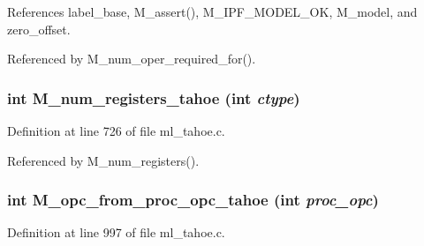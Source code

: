References label\_\-base, M\_\-assert(), M\_\-IPF\_\-MODEL\_\-OK, M\_\-model, and zero\_\-offset.

Referenced by M\_\-num\_\-oper\_\-required\_\-for().
\subsubsection{\setlength{\rightskip}{0pt plus 5cm}int M\_\-num\_\-registers\_\-tahoe (int {\em ctype})}\label{ml__tahoe_8c_4992cb0d712ac7229fddeb7990d4b6b7}




Definition at line 726 of file ml\_\-tahoe.c.

Referenced by M\_\-num\_\-registers().
\subsubsection{\setlength{\rightskip}{0pt plus 5cm}int M\_\-opc\_\-from\_\-proc\_\-opc\_\-tahoe (int {\em proc\_\-opc})}\label{ml__tahoe_8c_cdd8462d16e66d8641908c597a1729e6}




Definition at line 997 of file ml\_\-tahoe.c.

